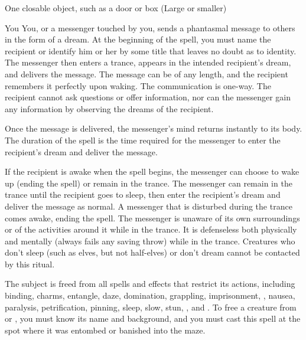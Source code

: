 \begin{spelltarget}{One closable object, such as a door or box (Large or smaller)}
\begin{spelltarget}{You}
\spelleffect You, or a messenger touched by you, sends a phantasmal message to others in the form of a dream. At the beginning of the spell, you must name the recipient or identify him or her by some title that leaves no doubt as to identity. The messenger then enters a trance, appears in the intended recipient's dream, and delivers the message. The message can be of any length, and the recipient remembers it perfectly upon waking. The communication is one-way. The recipient cannot ask questions or offer information, nor can the messenger gain any information by observing the dreams of the recipient.
\par Once the message is delivered, the messenger's mind returns instantly to its body. The duration of the spell is the time required for the messenger to enter the recipient's dream and deliver the message.
\par If the recipient is awake when the spell begins, the messenger can choose to wake up (ending the spell) or remain in the trance. The messenger can remain in the trance until the recipient goes to sleep, then enter the recipient's dream and deliver the message as normal. A messenger that is disturbed during the trance comes awake, ending the spell. The messenger is unaware of its own surroundings or of the activities around it while in the trance. It is defenseless both physically and mentally (always fails any saving throw) while in the trance.
\spellnotes Creatures who don't sleep (such as elves, but not half-elves) or don't dream cannot be contacted by this ritual. 

\spelleffect The subject is freed from all spells and effects that restrict its actions, including binding, charms, entangle, daze, domination, grappling, imprisonment, , nausea, paralysis, petrification, pinning, sleep, slow, stun, , and . To free a creature from  or , you must know its name and background, and you must cast this spell at the spot where it was entombed or banished into the maze.


\end{spelltarget}
\end{spelltarget}
